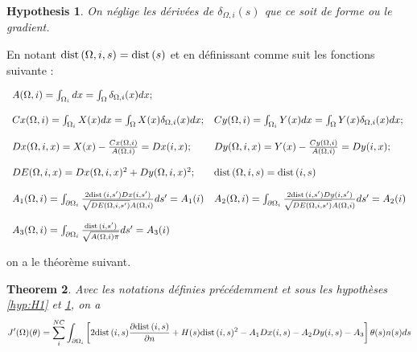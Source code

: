 \documentclass[11pt,a4paper]{article}
\newtheorem{theorem}{Theorem}[section]
\newtheorem{hypothese}[theorem]{Hypothesis}
\begin{document}
\begin{hypothese}
	\label{hyp:H2}
	On néglige les dérivées de $\delta_{\Omega,i}(s)$ que ce soit de forme ou le gradient.
\end{hypothese}

En notant $\textrm{dist}\,(\Omega,i,s)=\textrm{dist}\,(s)$ et en définissant comme suit les fonctions suivante :

\begin{equation}
\begin{array}{ll}
A(\Omega,i)=\int_{\Omega_{i}}dx=\int_{\Omega} \delta_{\Omega,i}(x)dx; & \, \\
\\
Cx(\Omega,i)=\int_{\Omega_{i}}X(x)dx=\int_{\Omega} X(x)\delta_{\Omega,i}(x)dx; & Cy(\Omega,i)=\int_{\Omega_{i}}Y(x)dx=\int_{\Omega} Y(x)\delta_{\Omega,i}(x)dx;\\	
\\
Dx(\Omega,i,x)=X(x)-\frac{Cx(\Omega,i)}{A(\Omega,i)} =Dx(i,x);& Dy(\Omega,i,x)=Y(x)-\frac{Cy(\Omega,i)}{A(\Omega,i)}=Dy(i,x); \\
\\
DE(\Omega,i,x)=Dx(\Omega,i,x)^2+Dy(\Omega,i,x)^2; &\textrm{dist}\,(\Omega,i,s)=\textrm{dist}\,(i,s) \\
\\
A_1(\Omega,i)=\int_{\partial\Omega_{i}}\frac{2\textrm{dist}\,(i,s')Dx(i,s')}{\sqrt{DE(\Omega,i,s')}A(\Omega,i)} ds'=A_1(i) & A_2(\Omega,i)=\int_{\partial\Omega_{i}}\frac{2\textrm{dist}\,(i,s')Dy(i,s')}{\sqrt{DE(\Omega,i,s')}A(\Omega,i)}ds'=A_2(i) \\
\\
A_3(\Omega,i)=\int_{\partial\Omega_{i}}\frac{\textrm{dist}\,(i,s')}{\sqrt{A(\Omega,i)\pi}}ds'=A_3(i) 
\end{array}
\end{equation}

on a le théorème suivant.

\begin{theorem}
	Avec les notations définies précédemment et sous les hypothèses \ref{hyp:H1} et \ref{hyp:H2}, on a 
	\begin{equation}
	J'(\Omega)(\theta)=\sum_{i}^{NC}\int_{\partial\Omega_{i}}\left[2\textrm{\textrm{dist}\,}(i,s)\frac{\partial\textrm{\textrm{dist}\,}(i,s)}{\partial n}+H(s)\textrm{\textrm{dist}\,}(i,s)^2-A_1Dx(i,s)-A_2Dy(i,s)-A_3\right]\theta(s)n(s)ds
	\end{equation}
\end{theorem}
\end{document}
